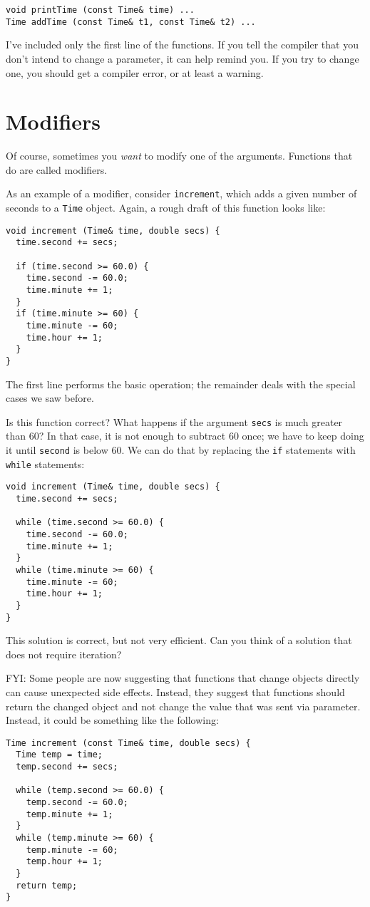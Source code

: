 \begin{verbatim}
void printTime (const Time& time) ...
Time addTime (const Time& t1, const Time& t2) ...
\end{verbatim}
%
I've included only the first line of the functions.  If you tell
the compiler that you don't intend to change a
parameter, it can help remind you.  If you try to change one,
you should get a compiler error, or at least a warning.


\section{Modifiers}

Of course, sometimes you {\em want} to modify one of the
arguments.  Functions that do are called modifiers.

As an example of a modifier, consider {\tt increment},
which adds a given number of seconds to a {\tt Time} object.
Again, a rough draft of this function looks like:

\begin{verbatim}
void increment (Time& time, double secs) {
  time.second += secs;

  if (time.second >= 60.0) {
    time.second -= 60.0;
    time.minute += 1;
  }
  if (time.minute >= 60) {
    time.minute -= 60;
    time.hour += 1;
  }
}
\end{verbatim}
%
The first line performs the basic operation; the remainder
deals with the special cases we saw before.

Is this function correct?  What happens if the argument {\tt secs}
is much greater than 60?  In that case, it is not enough to
subtract 60 once; we have to keep doing it until {\tt second}
is below 60.  We can do that by replacing the {\tt if}
statements with {\tt while} statements:

\begin{verbatim}
void increment (Time& time, double secs) {
  time.second += secs;

  while (time.second >= 60.0) {
    time.second -= 60.0;
    time.minute += 1;
  }
  while (time.minute >= 60) {
    time.minute -= 60;
    time.hour += 1;
  }
}
\end{verbatim}
%
This solution is correct, but not very efficient.
Can you think of a solution that does not require iteration?

FYI: Some people are now suggesting that functions that change objects directly can cause unexpected side effects. Instead, they suggest that functions should return the changed object and not change the value that
was sent via parameter. Instead, it could be something like the following:
\begin{verbatim}
Time increment (const Time& time, double secs) {
  Time temp = time;
  temp.second += secs;

  while (temp.second >= 60.0) {
    temp.second -= 60.0;
    temp.minute += 1;
  }
  while (temp.minute >= 60) {
    temp.minute -= 60;
    temp.hour += 1;
  }
  return temp;
}
\end{verbatim}
%
